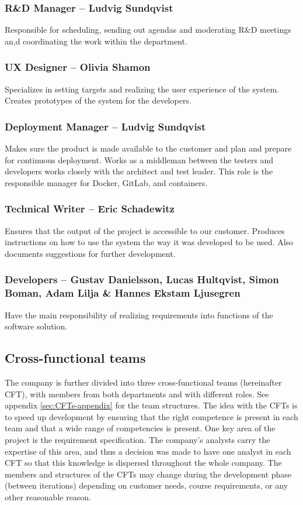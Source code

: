 \subsubsection*{R\&D Manager – Ludvig Sundqvist}
Responsible for scheduling, sending out agendas and moderating R\&D meetings an,d coordinating the work within the department.  

\subsubsection*{UX Designer – Olivia Shamon} 
Specializes in setting targets and realizing the user experience of the system. Creates prototypes of the system for the developers.  

\subsubsection*{Deployment Manager – Ludvig Sundqvist}
Makes sure the product is made available to the customer and plan and prepare for continuous deployment. Works as a middleman between the testers and developers works closely with the architect and test leader. This role is the responsible manager for Docker, GitLab, and containers. 

\subsubsection*{Technical Writer – Eric Schadewitz} 
Ensures that the output of the project is accessible to our customer. Produces instructions on how to use the system the way it was developed to be used. Also documents suggestions for further development. 

\subsubsection*{Developers – Gustav Danielsson, Lucas Hultqvist, Simon Boman, Adam Lilja \& Hannes Ekstam Ljusegren} 
Have the main responsibility of realizing requirements into functions of the software solution. 

\subsection{Cross-functional teams}
\label{sec:companywide:subsection:cft}
The company is further divided into three cross-functional teams (hereinafter CFT), with members from both departments and with different roles. See appendix \ref{sec:CFTs-appendix} for the team structures. The idea with the CFTs is to speed up development by ensuring that the right competence is present in each team and that a wide range of competencies is present. One key area of the project is the requirement specification. The company's analysts carry the expertise of this area, and thus a decision was made to have one analyst in each CFT so that this knowledge is dispersed throughout the whole company. The members and structures of the CFTs may change during the development phase (between iterations) depending on customer needs, course requirements, or any other reasonable reason.

